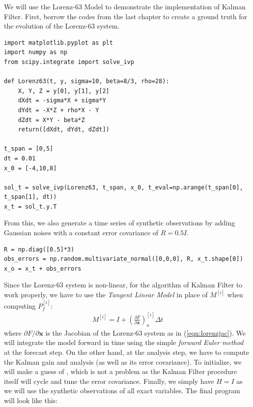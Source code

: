We will use the Lorenz-63 Model to demonstrate the implementation of Kalman Filter. First, borrow the codes from the last chapter to create a ground truth for the evolution of the Lorenz-63 system.
\begin{lstlisting}
import matplotlib.pyplot as plt
import numpy as np
from scipy.integrate import solve_ivp

def Lorenz63(t, y, sigma=10, beta=8/3, rho=28):
    X, Y, Z = y[0], y[1], y[2]
    dXdt = -sigma*X + sigma*Y
    dYdt = -X*Z + rho*X - Y
    dZdt = X*Y - beta*Z
    return([dXdt, dYdt, dZdt])

t_span = [0,5]
dt = 0.01
x_0 = [-4,10,8]

sol_t = solve_ivp(Lorenz63, t_span, x_0, t_eval=np.arange(t_span[0], t_span[1], dt))
x_t = sol_t.y.T
\end{lstlisting}
From this, we also generate a time series of synthetic observations by adding Gaussian noises with a constant error covariance of $R = 0.5I$.
\begin{lstlisting}
R = np.diag([0.5]*3)
obs_errors = np.random.multivariate_normal([0,0,0], R, x_t.shape[0])
x_o = x_t + obs_errors 
\end{lstlisting}
Since the Lorenz-63 system is non-linear, for the algorithm of Kalman Filter to work properly, we have to use the \textit{Tangent Linear Model} in place of $M^{[i]}$ when computing $P_f^{[i]}$:
\begin{align}
M^{[i]} = I + (\frac{\partial F}{\partial \textbf{x}})_a^{[i]} \Delta t
\end{align}
where $\partial F/\partial \textbf{x}$ is the Jacobian of the Lorenz-63 system as in (\ref{eqn:lorenzjac}). We will integrate the model forward in time using the simple \textit{forward Euler method} at the forecast step. On the other hand, at the analysis step, we have to compute the Kalman gain and analysis (as well as its error covariance). To initialize, we will make a guess of , which is not a problem as the Kalman Filter procedure itself will cycle and tune the error covariance. Finally, we simply have $H = I$ as we will use the synthetic observations of all exact variables. The final program will look like this:
